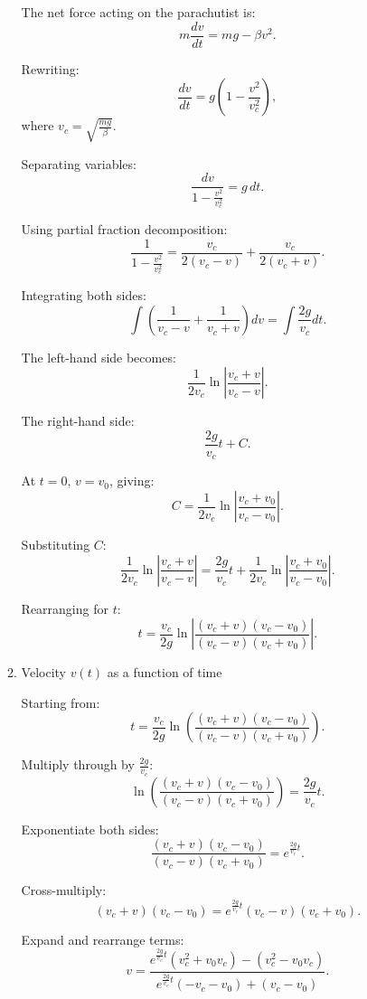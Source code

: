 \documentclass[12pt]{article}
\begin{document}
\begin{enumerate}
\begin{enumerate}
    The net force acting on the parachutist is:
    \[
    m \frac{dv}{dt} = mg - \beta v^2.
    \]

    Rewriting:
    \[
    \frac{dv}{dt} = g \left(1 - \frac{v^2}{v_c^2}\right),
    \]
    where $v_c = \sqrt{\frac{mg}{\beta}}$.

    Separating variables:
    \[
    \frac{dv}{1 - \frac{v^2}{v_c^2}} = g \, dt.
    \]

    Using partial fraction decomposition:
    \[
    \frac{1}{1 - \frac{v^2}{v_c^2}} = \frac{v_c}{2(v_c - v)} + \frac{v_c}{2(v_c + v)}.
    \]

    Integrating both sides:
    \[
    \int \left( \frac{1}{v_c - v} + \frac{1}{v_c + v} \right) dv = \int \frac{2g}{v_c} dt.
    \]

    The left-hand side becomes:
    \[
    \frac{1}{2v_c} \ln \left| \frac{v_c + v}{v_c - v} \right|.
    \]

    The right-hand side:
    \[
    \frac{2g}{v_c} t + C.
    \]

    At $t = 0$, $v = v_0$, giving:
    \[
    C = \frac{1}{2v_c} \ln \left| \frac{v_c + v_0}{v_c - v_0} \right|.
    \]

    Substituting $C$:
    \[
    \frac{1}{2v_c} \ln \left| \frac{v_c + v}{v_c - v} \right| = \frac{2g}{v_c} t + \frac{1}{2v_c} \ln \left| \frac{v_c + v_0}{v_c - v_0} \right|.
    \]

    Rearranging for $t$:
    \[
    t = \frac{v_c}{2g} \ln \left| \frac{(v_c + v)(v_c - v_0)}{(v_c - v)(v_c + v_0)} \right|.
    \]

    \item Velocity $v(t)$ as a function of time

    Starting from:
    \[
    t = \frac{v_c}{2g} \ln \left( \frac{(v_c + v)(v_c - v_0)}{(v_c - v)(v_c + v_0)} \right).
    \]

    Multiply through by $\frac{2g}{v_c}$:
    \[
    \ln \left( \frac{(v_c + v)(v_c - v_0)}{(v_c - v)(v_c + v_0)} \right) = \frac{2g}{v_c} t.
    \]

    Exponentiate both sides:
    \[
    \frac{(v_c + v)(v_c - v_0)}{(v_c - v)(v_c + v_0)} = e^{\frac{2g}{v_c} t}.
    \]

    Cross-multiply:
    \[
    (v_c + v)(v_c - v_0) = e^{\frac{2g}{v_c} t} (v_c - v)(v_c + v_0).
    \]

    Expand and rearrange terms:
    \[
    v = \frac{e^{\frac{2g}{v_c} t} (v_c^2 + v_0 v_c) - (v_c^2 - v_0 v_c)}{e^{\frac{2g}{v_c} t} (-v_c - v_0) + (v_c - v_0)}.
    \]


\end{enumerate}
\end{enumerate}
\end{document}
